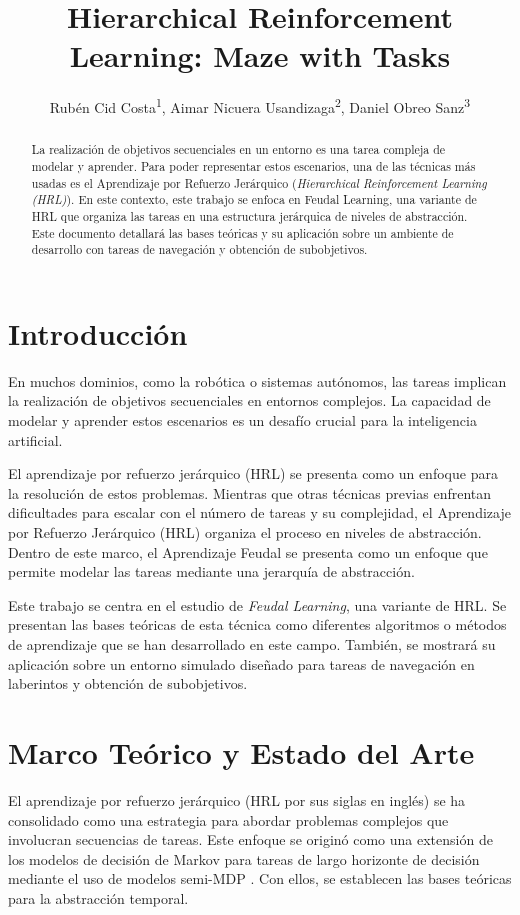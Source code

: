 \documentclass[letterpaper]{article} %
\title{Hierarchical Reinforcement Learning: Maze with Tasks}
\author {
    Rubén Cid Costa\textsuperscript{\rm 1},
    Aimar Nicuera Usandizaga\textsuperscript{\rm 2},
    Daniel Obreo Sanz\textsuperscript{\rm 3}
}
\begin{document}
\maketitle

\begin{abstract}
La realización de objetivos secuenciales en un entorno es una tarea compleja de modelar y aprender. Para poder representar estos
escenarios, una de las técnicas más usadas es el Aprendizaje por Refuerzo Jerárquico (\textit{Hierarchical Reinforcement Learning (HRL)}).
En este contexto, este trabajo se enfoca en Feudal Learning, una variante de HRL que organiza las tareas en una estructura jerárquica de
niveles de abstracción. Este documento detallará las bases teóricas y su aplicación sobre un ambiente de desarrollo con tareas de navegación y
obtención de subobjetivos.
\end{abstract}

\section{Introducción}

En muchos dominios, como la robótica o sistemas autónomos, las tareas implican la realización de objetivos secuenciales en entornos complejos.
La capacidad de modelar y aprender estos escenarios es un desafío crucial para la inteligencia artificial.

El aprendizaje por refuerzo jerárquico (HRL) se presenta como un enfoque para la resolución de estos problemas. Mientras que otras técnicas previas
enfrentan dificultades para escalar con el número de tareas y su complejidad, el Aprendizaje por Refuerzo Jerárquico (HRL) organiza el proceso en 
niveles de abstracción. Dentro de este marco, el Aprendizaje Feudal se presenta como un enfoque que permite modelar las tareas mediante una jerarquía
de abstracción.

Este trabajo se centra en el estudio de \textit{Feudal Learning}, una variante de HRL. Se presentan las bases teóricas de esta técnica como diferentes algoritmos
o métodos de aprendizaje que se han desarrollado en este campo. También, se mostrará su aplicación sobre un entorno simulado diseñado para tareas 
de navegación en laberintos y obtención de subobjetivos. 

\section{Marco Teórico y Estado del Arte}
El aprendizaje por refuerzo jerárquico (HRL por sus siglas en inglés) se ha consolidado como una estrategia para abordar problemas complejos
que involucran secuencias de tareas. Este enfoque se originó como una extensión de los modelos de decisión de Markov para tareas de largo horizonte
de decisión mediante el uso de modelos semi-MDP \cite{sutton1999between}. Con ellos, se establecen las bases teóricas para la abstracción temporal.
\end{document}
